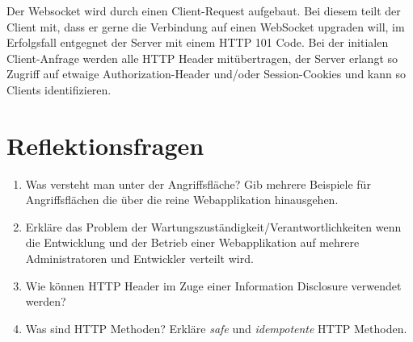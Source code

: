 Der Websocket wird durch einen Client-Request aufgebaut. Bei diesem teilt der Client mit, dass er gerne die Verbindung auf einen WebSocket upgraden will, im Erfolgsfall entgegnet der Server mit einem HTTP 101 Code. Bei der initialen Client-Anfrage werden alle HTTP Header mitübertragen, der Server erlangt so Zugriff auf etwaige Authorization-Header und/oder Session-Cookies und kann so Clients identifizieren.

\section{Reflektionsfragen}

\begin{enumerate}
	\item Was versteht man unter der Angriffsfläche? Gib mehrere Beispiele für Angriffsflächen die über die reine Webapplikation hinausgehen.
	\item Erkläre das Problem der Wartungszuständigkeit/Verantwortlichkeiten wenn die Entwicklung und der Betrieb einer Webapplikation auf mehrere Administratoren und Entwickler verteilt wird.
	\item Wie können HTTP Header im Zuge einer Information Disclosure verwendet werden?
	\item Was sind HTTP Methoden? Erkläre \textit{safe} und \textit{idempotente} HTTP Methoden.
\end{enumerate}

